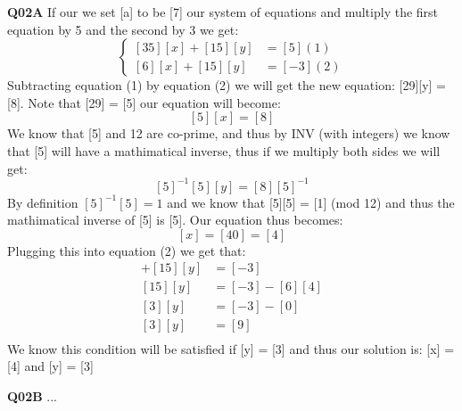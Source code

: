 \documentclass[11pt]{article}
\begin{document}
\parindent=0pt

\textbf{Q02A} If our we set [a] to be [7] our system of equations and multiply the first equation by 5 and the second by 3 we get:
$$
\begin{cases}
[35][x] + [15][y] & = [5]       (1)\\
[6][x] + [15][y] & = [-3]      (2)
\end{cases}
$$
Subtracting equation (1) by equation (2) we will get the new equation: [29][y] = [8]. Note that [29] = [5] our equation will become:
\[ [5][x] = [8] \]
We know that [5] and 12 are co-prime, and thus by INV (with integers) we know that [5] will have a mathimatical inverse, thus if we multiply both sides we will get:
\[ [5]^{-1}[5][y] = [8][5]^{-1} \]
By definition $[5]^{-1}[5] = 1$ and we know that [5][5] = [1] (mod 12) and thus the mathimatical inverse of [5] is [5]. Our equation thus becomes:
\[ [x] = [40] = [4] \]
Plugging this into equation (2) we get that:
\begin{align*}
 [6][x] + [15][y] & = [-3]  \\
 [15][y]  & = [-3]  - [6][4] \\
 [3][y]  & = [-3]  - [0] \\
 [3][y]  & = [9]\\
\end{align*}
We know this condition will be satisfied if [y] = [3] and thus our solution is: [x] = [4] and [y] = [3]


\textbf{Q02B} ...
\end{document}

